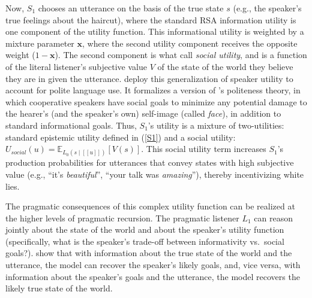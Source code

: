 \documentclass[10pt,letterpaper]{article}
\newcommand{\mf}[1]{\textcolor{orange}{[mf: #1]}}
\newcommand{\mht}[1]{\textcolor{purple}{[mht: #1]}}
\newcommand{\sem}[1]{\ensuremath{[\![#1]\!]}}
\begin{document}
Now, $S_1$ chooses an utterance on the basis of the true state $s$ (e.g., the speaker's true feelings about the haircut), where the standard RSA information utility is one component of the utility function. 
This informational utility is weighted by a mixture parameter $\textbf{x}$, where the second utility component receives the opposite weight ($1-\textbf{x}$).
The second component is what \cite{yoonetal2016} call \emph{social utility}, and is a function of the literal listener's subjective value $V$ of the state of the world they believe they are in given the utterance.
\cite{yoonetal2016} deploy this generalization of speaker utility to account for polite language use. 
It formalizes a version of \cite{brown1987politeness}'s politeness theory, in which cooperative speakers have social goals to minimize any potential damage to the hearer’s (and the speaker’s own) self-image (called \emph{face}), in addition to standard informational goals.
Thus, $S_1$'s utility is a mixture of two-utilities: standard epistemic utility defined in (\ref{S1}) and a social utility: $U_{social}(u)  =  \mathbb{E}_{L_0(s \mid \sem{u})}[V(s)]$.
%
This social utility term increases $S_1$'s production probabilities for utterances that convey states with high subjective value (e.g., ``it's \emph{beautiful}'', ``your talk was \emph{amazing}''), thereby incentivizing white lies. 

The pragmatic consequences of this complex utility function can be realized at the higher levels of pragmatic recursion.
The pragmatic listener $L_1$ can reason jointly about the state of the world and about the speaker's utility function (specifically, what is the speaker's trade-off between informativity vs.~social goals?). \cite{yoonetal2016} show that with information about the true state of the world and the utterance, the model can recover the speaker's likely goals, and, vice versa, with information about the speaker's goals and the utterance, the model recovers the likely true state of the world.
\end{document}
